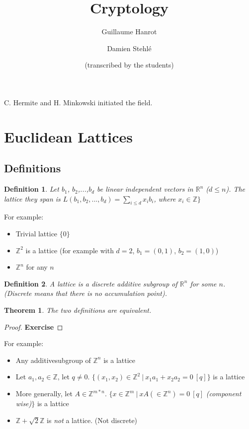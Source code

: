 \documentclass[a4paper,10pt]{article}
\author{Guillaume Hanrot \and Damien Stehlé \\ \and (transcribed by the students)}
\title{Cryptology}
\newtheorem{definition}{Definition}
\newtheorem{theorem}{Theorem}
\begin{document}
 

\maketitle

C. Hermite and H. Minkowski initiated the field.

\section{Euclidean Lattices}
\subsection{Definitions}

\begin{definition}
Let $b_1$, $b_2$,...,$b_d$ be linear independent vectors in $\mathbb{R}^n$ ($d \leq n$). The lattice they span is $L(b_1,b_2,...,b_d)= \sum_{i \leq d} x_i b_i$, where $x_i \in \mathbb{Z} \}$
\end{definition}

For example:
\begin{itemize}
\item Trivial lattice $\{0\}$
\item $\mathbb{Z}^2$ is a lattice (for example with $d=2$, $b_1=(0,1)$, $b_2=(1,0)$)
\item $\mathbb{Z}^n$ for any $n$
\end{itemize}

\begin{definition}
A lattice is a discrete additive subgroup of $\mathbb{R}^n$ for some $n$. (Discrete means that there is no accumulation point).
\end{definition}

\begin{theorem}
The two definitions are equivalent.
\end{theorem}

\begin{proof}
\textbf{Exercise}
\end{proof}

For example:
\begin{itemize}
\item Any additivesubgroup of $\mathbb{Z}^n$ is a lattice
\item Let $a_1, a_2 \in \mathbb{Z}$, let $q \neq 0$. $\{ (x_1,x_2) \in \mathbb{Z}^2 \ | \ x_1 a_1+x_2 a_2 = 0 \ [q]  \}$ is a lattice
\item More generally, let $A \in \mathbb{Z}^{m*n}$. $\{ x \in \mathbb{Z}^m \ | \ xA (\in \mathbb{Z}^n)=0 \ [q]$ \textit{(component wise)}$\}$ is a lattice
\item $\mathbb{Z}+\sqrt{2} \mathbb{Z}$ is \textit{not} a lattice. (Not discrete)
\end{itemize}
\end{document}
